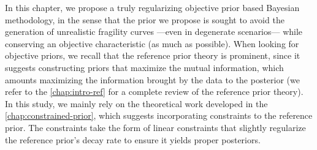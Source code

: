 






In this chapter, we propose a truly regularizing objective prior based Bayesian methodology, in the sense that the prior we propose is sought to avoid the generation of unrealistic fragility curves ---even in degenerate scenarios--- while conserving an objective characteristic (as much as possible).
When looking for objective priors, we recall that the reference prior theory is prominent, since it suggests constructing priors that maximize the mutual information,  which amounts maximizing the information brought by the data to the posterior (we refer to the \cref{chap:intro-ref} for a complete review of the reference prior theory).
In this study, we
mainly rely on the theoretical work developed in the \cref{chap:constrained-prior}, which suggests incorporating constraints to the reference prior. %
The constraints %
take the form of linear constraints that slightly regularize the reference prior's decay rate to ensure it yields proper posteriors.


